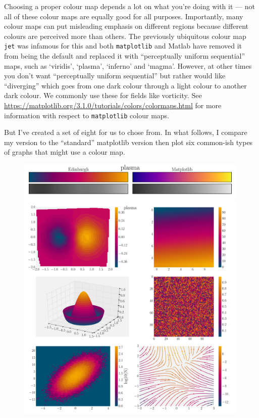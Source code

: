 \documentclass[10pt,a4paper]{article}
\begin{document}
Choosing a proper colour map depends a lot on what you're doing with it --- not all of these colour maps are equally good for all purposes. 
Importantly, many colour maps can put misleading emphasis on different regions because different colours are perceived more than others. 
The previously ubiquitous colour map \texttt{jet} was infamous for this and both \texttt{matplotlib} and Matlab have removed it from being the default and replaced it with ``perceptually uniform sequential'' maps, such as  `viridis', `plasma', `inferno' and `magma'. 
However, at other times you don't want ``perceptually uniform sequential'' but rather would like ``diverging'' which goes from one dark colour through a light colour to another dark colour. 
We commonly use these for fields like vorticity. 
See \url{https://matplotlib.org/3.1.0/tutorials/colors/colormaps.html} for more information with respect to \texttt{matplotlib} colour maps. 

But I've created a set of eight for us to chose from. 
In what follows, I compare my version to the ``standard'' matplotlib version then plot six common-ish types of graphs that might use a colour map. 


\newpage
\begin{figure}[ht]
  \centering
  \includegraphics[width=0.99\textwidth]{plasmaBars.pdf}
  \includegraphics[width=0.99\textwidth]{plasmaExamples.pdf}
\end{figure}
\end{document}
